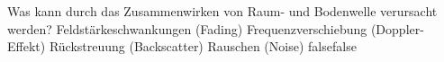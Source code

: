     {Was kann durch das Zusammenwirken von Raum- und Bodenwelle verursacht werden?}
    {Feldstärkeschwankungen (Fading)}
    {Frequenzverschiebung (Doppler-Effekt)}
    {Rückstreuung (Backscatter)}
    {Rauschen (Noise)}
    {false}{false}